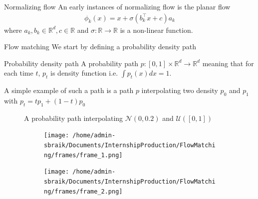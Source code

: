 \documentclass{beamer}
\begin{document}
\begin{frame}{Normalizing flow}
    An early instances  of normalizing flow is the planar flow 
    \begin{align*}
        \phi_k(x)=x+\sigma(b_k^\intercal x+c)a_k
    \end{align*}
    where \(a_k,b_k\in\mathbb{R}^d, c\in\mathbb{R}\) and  \(\sigma:\mathbb{R}\rightarrow\mathbb{R}\) is a non-linear function.
\end{frame}

\begin{frame}{Flow matching}
    We start by defining a probability density path
    \begin{block}{Probability density path}
        A probability path \(p:[0,1]\times\mathbb{R}^d\rightarrow\mathbb{R}^d\) meaning that for each time \(t\), \(p_t\) is density function i.e. \(\int p_t(x)dx=1\).\\
    \end{block}
    A simple example of such a path is a path \(p\) interpolating two density \(p_0\) and \(p_1\) with \(p_t=tp_1+(1-t)p_0\)
    \begin{figure}[htbp]
        \centering
        \caption{A probability path interpolating $\mathcal{N}(0,0.2)$ and $\mathcal{U}([0,1])$}
    \end{figure}
\end{frame}


\begin{frame}
    \begin{figure}[h]
        \centering
        \begin{subfigure}[b]{0.8\textwidth}
          \texttt{[image: /home/admin-sbraik/Documents/InternshipProduction/FlowMatching/frames/frame\_1.png]}
        \end{subfigure}
        \par\medskip
        \begin{subfigure}[b]{0.8\textwidth}
          \texttt{[image: /home/admin-sbraik/Documents/InternshipProduction/FlowMatching/frames/frame\_2.png]}
        \end{subfigure}
    \end{figure}

\end{frame}
\end{document}
